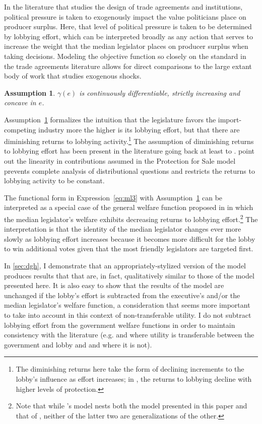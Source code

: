 \documentclass[authoryear, review]{elsarticle}
\newtheorem{assumption}{Assumption}
\newcommand{\ga}{\gamma}
\begin{document}
In the literature that studies the design of trade agreements and institutions, political pressure is taken to exogenously impact the value politicians place on producer surplus. Here, that level of political pressure is taken to be determined by lobbying effort, which can be interpreted broadly as any action that serves to increase the weight that the median legislator places on producer surplus when taking decisions. Modeling the objective function so closely on the standard in the trade agreements literature allows for direct comparisons to the large extant body of work that studies exogenous shocks.

\begin{assumption}
  $\ga(e)$ is continuously differentiable, strictly increasing and concave in $e$.
  \label{as:ga_c3}
\end{assumption}

Assumption~\ref{as:ga_c3} formalizes the intuition that the legislature favors the import-competing industry more the higher is its lobbying effort, but that there are diminishing returns to lobbying activity.\footnote{The diminishing returns here take the form of declining increments to the lobby's influence as effort increases; in \citet{ethier2012}, the returns to lobbying decline with higher levels of protection.} The assumption of diminishing returns to lobbying effort has been present in the literature going back at least to \citet{fw}. \citet{dgh97} point out the linearity in contributions assumed in the Protection for Sale model prevents complete analysis of distributional questions and restricts the returns to lobbying activity to be constant.

The functional form in Expression~\ref{eq:ml3} with Assumption~\ref{as:ga_c3} can be interpreted as a special case of the general welfare function proposed in \citet{dgh97} in which the median legislator's welfare exhibits decreasing returns to lobbying effort.\footnote{Note that while \citet{dgh97}'s model nests both the model presented in this paper and that of \citet{gh94}, neither of the latter two are generalizations of the other.\label{fn:dghpfs}} The interpretation is that the identity of the median legislator changes ever more slowly as lobbying effort increases because it becomes more difficult for the lobby to win additional votes given that the most friendly legislators are targeted first.

In \ref{sec:dgh}, I demonstrate that an appropriately-stylized version of the \citet{dgh97} model produces results that that are, in fact, qualitatively similar to those of the model presented here. It is also easy to show that the results of the model are unchanged if the lobby's effort is subtracted from the executive's and/or the median legislator's welfare function, a consideration that seems more important to take into account in this context of non-transferable utility. I do not subtract lobbying effort from the government welfare functions in order to maintain consistency with the literature (e.g. \citet{gh94} and \citet{mrc2007} where utility is transferable between the government and lobby and \citet{dgh97} and \citet{lt} where it is not).
\end{document}
